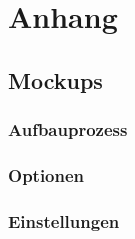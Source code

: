 \chapter{Anhang}\label{ch:Anhang}

\section{Mockups}

\subsection{Aufbauprozess}

\subsection{Optionen}





\subsection{Einstellungen}\label{ssec:MockupEinstellungen}
